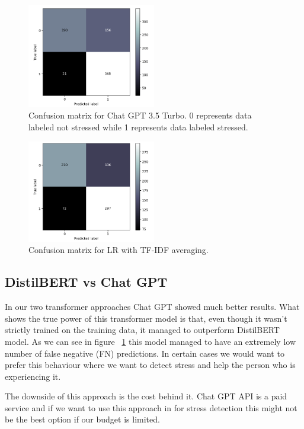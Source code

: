 \documentclass[10pt, a4paper]{article}
\begin{document}
\begin{figure}
    \centering
    \includegraphics[width=0.5\textwidth]{images/conf-matrix-chatgpt}
    \caption{Confusion matrix for Chat GPT 3.5 Turbo. 0 represents data labeled not stressed while 1 represents data labeled stressed.}
    \label{fig:chat-gpt-conf-matrix}
\end{figure}

\begin{figure}
    \centering
    \includegraphics[width=0.5\textwidth]{images/conf-matrix-logreg}
    \caption{Confusion matrix for LR with TF-IDF averaging.}
    \label{fig:logreg-conf-matrix}
\end{figure}


\subsection{DistilBERT vs Chat GPT}
In our two transformer approaches Chat GPT showed much better results.
What shows the true power of this transformer model is that, even though it wasn't strictly trained on the training data, it managed to outperform DistilBERT model.
As we can see in figure ~\ref{fig:chat-gpt-conf-matrix} this model managed to have an extremely low number of false negative (FN) predictions.
In certain cases we would want to prefer this behaviour where we want to detect stress and help the person who is experiencing it.

The downside of this approach is the cost behind it.
Chat GPT API is a paid service and if we want to use this approach in for stress detection this might not be the best option if our budget is limited.
\end{document}
